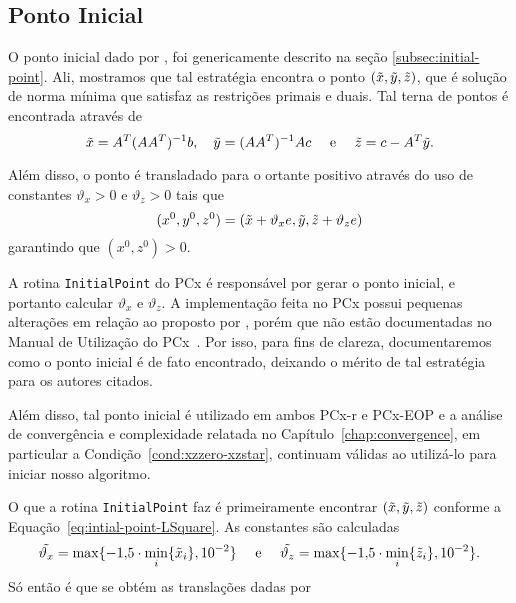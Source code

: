 \subsection{Ponto Inicial}

O ponto inicial dado por \textcite{Mehrotra:1992wr}, foi genericamente descrito na seção \ref{subsec:initial-point}. Ali, mostramos que tal estratégia encontra o ponto $(\tilde{x},\tilde{y},\tilde{z})$, que é solução de norma mínima que satisfaz as restrições primais e
duais. Tal terna de pontos é encontrada através de
\begin{equation}
	\label{eq:intial-point-LSquare}
	\tilde{x} = A^T(AA^T)^{-1}b, \quad \tilde{y} = (AA^T)^{-1}Ac\quad \text{ e }
\quad \tilde{z} = c - A^T\tilde{y}.
\end{equation}

Além disso, o ponto é transladado para o ortante positivo 
através do uso de constantes  $\vartheta_x>0$ e $\vartheta_ z>0$ tais que  
\begin{equation}
	\label{eq:intial-point-generated}
(x^0,y^0,z^0) = (\tilde{x}+ \vartheta_x e,\tilde{y},\tilde{z}+\vartheta_z e)
\end{equation}
garantindo que $(x^0,z^0)>0$.


 A rotina \verb|InitialPoint| do PCx é responsável por gerar o ponto inicial, e portanto calcular  $\vartheta_x$ e $\vartheta_ z$. A implementação feita no PCx possui  pequenas alterações em relação ao proposto por \citeauthor{Mehrotra:1992wr}, porém que não  estão documentadas no Manual de Utilização do PCx~\cite{Czyzyk:1998vw}. Por isso, para fins de clareza, documentaremos como o ponto inicial é de fato encontrado, deixando o mérito de tal estratégia para os autores citados.

  Além disso, tal ponto inicial é utilizado em ambos PCx-r e PCx-EOP e a análise de convergência e complexidade relatada no Capítulo~\ref{chap:convergence}, em particular a Condição~\ref{cond:xzzero-xzstar}, continuam válidas ao utilizá-lo para iniciar nosso algoritmo.

O que a rotina  \verb|InitialPoint| faz é primeiramente encontrar  $(\tilde{x},\tilde{y},\tilde{z})$ conforme a Equação~\eqref{eq:intial-point-LSquare}. As constantes são calculadas
\begin{equation}
	\label{eq:initial-point-tilde-var}
\tilde{\vartheta_x} = \max\{\displaystyle\num{-1.5}\cdot\min_{i}\{\tilde{x}_{i}\},\num{e-2}\} \quad \text{ e }\quad  \tilde{\vartheta_z} = \max\{\displaystyle\num{-1.5}\cdot\min_{i}\{\tilde{z}_{i}\},\num{e-2}\}.
\end{equation}
Só então é que se obtém as translações dadas por 

